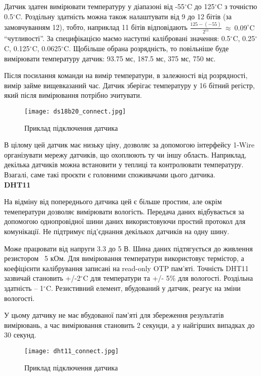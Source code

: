 Датчик здатен вимірювати температуру у діапазоні від -55$^\circ$C до 125$^\circ$C з точністю 0.5$^\circ$C. Роздільну здатність можна також налаштувати від 9 до 12 бітів (за замовчуванням 12), тобто, наприклад 11 бітів відповідають {$\frac{125-(-55)}{2^{11}}~\approx~0.09^\circ$C} ``чутливості''. За специфікацією маємо наступні калібровані значення: 0.5$^\circ$C, 0.25$^\circ$C, 0.125$^\circ$C, 0.0625$^\circ$C. Щобільше обрана розрядність, то повільніше буде вимірювати температуру датчик: 93.75 мс, 187.5 мс, 375 мс, 750 мс.

Після посилання команди на вимір температури, в залежності від розрядності, вимір займе вищевказаний час. Датчик зберігає температуру у 16 бітний регістр, який після вимірювання потрібно зчитувати.

\begin{figure}[ht]
    \centering
    \texttt{[image: ds18b20\_connect.jpg]}
    \caption{Приклад підключення датчика}
    \label{fig:}
\end{figure}

В цілому цей датчик має низьку ціну, дозволяє за допомогою інтерфейсу 1-Wire організувати мережу датчиків, що охоплюють ту чи іншу область. Наприклад, декілька датчиків можна встановити у теплиці та контролювати температуру. Взагалі, саме такі проєкти є головними споживачами цього датчика.\\

\textbf{DHT11}\bigskip

На відміну від попереднього датчика цей є більше простим, але окрім темеператури дозволяє вимірювати вологість. Передача даних відбувається за допомогою однопровідної шини даних використовуючи простий протокол для комунікації. Не підтримує під'єднання декількох датчиків на одну шину.

Може працювати від напруги 3.3 до 5 В. Шина даних підтягується до живлення резистором ~5 кОм. Для вимірювання температури використовує термістор, а коефіцієнти калібрування записані на read-only OTP пам'яті. Точність DHT11 зазвичай становить +/-2$^\circ$C для температури та +/- 5\% для вологості. Роздільна здатність -- 1$^\circ$C. Резистивний елемент, вбудований у датчик, реагує на зміни вологості.

У цьому датчику не має вбудованої пам'яті для збереження результатів вимірювань, а час вимірювання становить 2 секунди, а у найгірших випадках до 30 секунд.

\begin{figure}[ht]
    \centering
    \texttt{[image: dht11\_connect.jpg]}
    \caption{Приклад підключення датчика}
    \label{fig:}
\end{figure}

